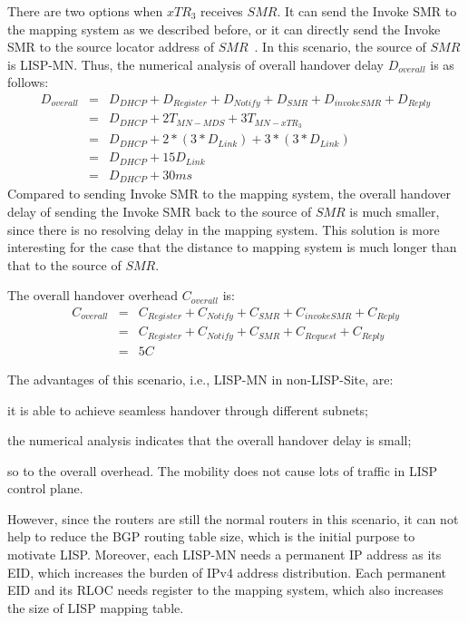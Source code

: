 There are two options when $xTR_3$ receives $SMR$. It can send the Invoke SMR to the mapping system as we described before, or it can directly send the Invoke SMR to the source locator address of $SMR$~\cite{rfc6830}. In this scenario, the source of $SMR$ is LISP-MN. Thus, the numerical analysis of overall handover delay $D_{overall}$ is as follows:
\begin{eqnarray}
D_{overall} &=& D_{DHCP} + D_{Register} + D_{Notify} + D_{SMR} + D_{invokeSMR} + D_{Reply} \nonumber \\
&=& D_{DHCP} + 2T_{MN-MDS} + 3T_{MN-xTR_3}  \nonumber \\
&=& D_{DHCP} + 2* (3*D_{Link}) + 3*(3*D_{Link}) \nonumber \\
&=& D_{DHCP} + 15D_{Link}  \\
&=& D_{DHCP} + 30 ms \nonumber
\end{eqnarray}
Compared to sending Invoke SMR to the mapping system, the overall handover delay of sending the Invoke SMR back to the source of $SMR$ is much smaller, since there is no resolving delay in the mapping system. This solution is more interesting for the case that the distance to mapping system is much longer than that to the source of $SMR$.

The overall handover overhead $C_{overall}$ is:
\begin{eqnarray}
C_{overall} &=& C_{Register} + C_{Notify} + C_{SMR} + C_{invokeSMR} + C_{Reply} \nonumber \\
&=& C_{Register} + C_{Notify} + C_{SMR} + C_{Request} + C_{Reply} \nonumber \\
&=& 5 C
\end{eqnarray}

The advantages of this scenario, i.e., LISP-MN in non-LISP-Site, are: 
\begin{inparaenum}[1)]
	\item it is able to achieve seamless handover through different subnets;
	\item the numerical analysis indicates that the overall handover delay is small;
	\item so to the overall overhead. The mobility does not cause lots of traffic in LISP control plane.
\end{inparaenum}
However, since the routers are still the normal routers in this scenario, it can not help to reduce the BGP routing table size, which is the initial purpose to motivate LISP. Moreover, each LISP-MN needs a permanent IP address as its EID, which increases the burden of IPv4 address distribution. Each permanent EID and its RLOC needs register to the mapping system, which also increases the size of LISP mapping table.

